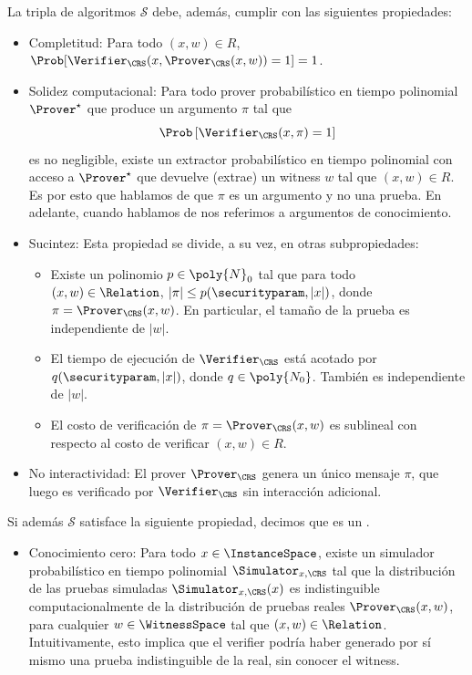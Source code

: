 \begin{definition}[\SNARK, \zkSNARK]
	La tripla de algoritmos $\mathcal{S}$ debe, además, cumplir con las siguientes propiedades:
	\begin{itemize}
		\item Completitud: Para todo $(x,w) \in R$, $\Prob[\Verifier_\CRS(x,\Prover_\CRS(x,w)) = 1] = 1$.
		\item Solidez computacional: Para todo prover probabilístico en tiempo polinomial $\Prover^\star$ que produce un argumento $\pi$ tal que
		$$\Prob\left[\Verifier_\CRS(x, \pi) = 1\right]$$
		es no negligible, existe un extractor probabilístico en tiempo polinomial con acceso a $\Prover^\star$ que devuelve (extrae) un witness $w$ tal que \((x,w) \in R\). Es por esto que hablamos de que $\pi$ es un argumento y no una prueba. En adelante, cuando hablamos de \SNARK nos referimos a argumentos de conocimiento.
		\item Sucintez: Esta propiedad se divide, a su vez, en otras subpropiedades:
		\begin{itemize}
			\item Existe un polinomio $p \in \poly{N}_0$ tal que para todo $(x,w) \in \Relation$, $|\pi| \leq p(\securityparam, |x|)$, donde $\pi = \Prover_\CRS(x,w)$. En particular, el tamaño de la prueba es independiente de $|w|$.
			\item El tiempo de ejecución de $\Verifier_\CRS$ está acotado por $q(\securityparam, |x|)$, donde $q \in \poly{N_0}$. También es independiente de $|w|$.
			\item El costo de verificación de $\pi = \Prover_\CRS(x, w)$ es sublineal con respecto al costo de verificar $(x,w) \in R$.
		\end{itemize}
		\item No interactividad: El prover $\Prover_\CRS$ genera un único mensaje $\pi$, que luego es verificado por $\Verifier_\CRS$ sin interacción adicional.
	\end{itemize}
	
		Si además $\mathcal{S}$ satisface la siguiente propiedad, decimos que es un \zkSNARK.
	\begin{itemize}
		\item Conocimiento cero: Para todo $x \in \InstanceSpace$, existe un simulador probabilístico en tiempo polinomial $\Simulator_{x,\CRS}$ tal que la distribución de las pruebas simuladas $\Simulator_{x,\CRS}(x)$ es indistinguible computacionalmente de la distribución de pruebas reales $\Prover_\CRS(x,w)$, para cualquier $w \in \WitnessSpace$ tal que $(x,w) \in \Relation$. Intuitivamente, esto implica que el verifier podría haber generado por sí mismo una prueba indistinguible de la real, sin conocer el witness.
	\end{itemize}
\end{definition}

